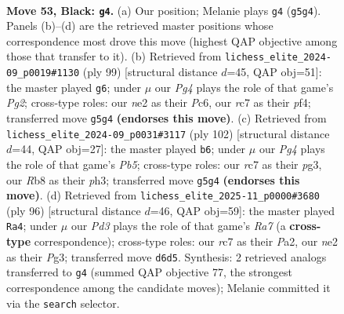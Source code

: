 \documentclass[11pt]{article}
\begin{document}
\clearpage

\begin{figure}[p]\centering
\begin{subfigure}{0.46\textwidth}\centering
\resizebox{\linewidth}{!}{%
\newchessgame
\chessboard[
  setfen={1r6/2R5/3pk3/5npp/8/1p6/1R2NKPr/8 b - - 5 53},
  showmover=false,
  pgfstyle=straightmove, color=movearrow, markmove={g5-g4}
]}
\caption{}
\end{subfigure}\hfill
\begin{subfigure}{0.46\textwidth}\centering
\resizebox{\linewidth}{!}{%
\newchessgame
\chessboard[
  setfen={8/5kp1/r1p5/P1p1R3/5PP1/2r5/R5K1/8 b - - 0 50},
  showmover=false,
  pgfstyle=straightmove, color=movearrow, markmove={g7-g6}
]}
\caption{}
\end{subfigure}
\\[4pt]
\begin{subfigure}{0.46\textwidth}\centering
\resizebox{\linewidth}{!}{%
\newchessgame
\chessboard[
  setfen={8/R4nk1/5r2/1PK5/P3B3/6pp/2P5/8 w - - 0 52},
  showmover=false,
  pgfstyle=straightmove, color=movearrow, markmove={b5-b6}
]}
\caption{}
\end{subfigure}\hfill
\begin{subfigure}{0.46\textwidth}\centering
\resizebox{\linewidth}{!}{%
\newchessgame
\chessboard[
  setfen={4r3/R3Pk2/2r5/8/2p2P2/2R3P1/P7/6K1 w - - 3 49},
  showmover=false,
  pgfstyle=straightmove, color=movearrow, markmove={a7-a4}
]}
\caption{}
\end{subfigure}
\caption{\textbf{Move 53, Black: \texttt{g4}.} (a) Our position; Melanie plays \texttt{g4} (\texttt{g5g4}). Panels (b)--(d) are the retrieved master positions whose correspondence most drove this move (highest QAP objective among those that transfer to it). (b) Retrieved from \texttt{lichess\_elite\_2024-09\_p0019\#1130} (ply 99) [structural distance $d$=45, QAP obj=51]: the master played \texttt{g6}; under $\mu$ our \emph{Pg4} plays the role of that game's \emph{Pg2}; cross-type roles: our \emph{n}e2 as their \emph{P}c6, our \emph{r}c7 as their \emph{p}f4; transferred move \texttt{g5g4} \textbf{(endorses this move)}. (c) Retrieved from \texttt{lichess\_elite\_2024-09\_p0031\#3117} (ply 102) [structural distance $d$=44, QAP obj=27]: the master played \texttt{b6}; under $\mu$ our \emph{Pg4} plays the role of that game's \emph{Pb5}; cross-type roles: our \emph{r}c7 as their \emph{p}g3, our \emph{R}b8 as their \emph{p}h3; transferred move \texttt{g5g4} \textbf{(endorses this move)}. (d) Retrieved from \texttt{lichess\_elite\_2025-11\_p0000\#3680} (ply 96) [structural distance $d$=46, QAP obj=59]: the master played \texttt{Ra4}; under $\mu$ our \emph{Pd3} plays the role of that game's \emph{Ra7} (a \textbf{cross-type} correspondence); cross-type roles: our \emph{r}c7 as their \emph{P}a2, our \emph{n}e2 as their \emph{P}g3; transferred move \texttt{d6d5}. Synthesis: 2 retrieved analogs transferred to \texttt{g4} (summed QAP objective 77, the strongest correspondence among the candidate moves); Melanie committed it via the \texttt{search} selector.}
\label{fig:thought-m105}
\end{figure}
\end{document}
